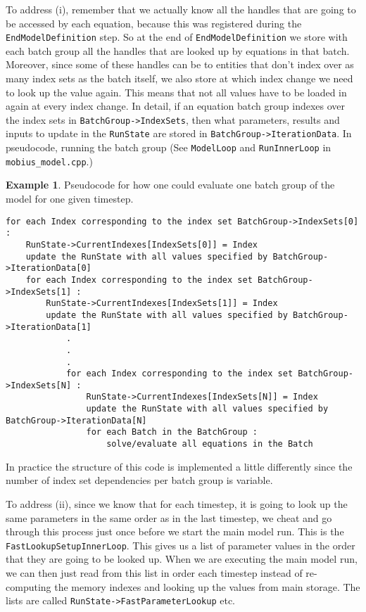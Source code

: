 \documentclass[11pt]{article}
\theoremstyle{definition}
\newtheorem{myexample}{Example}
\newenvironment{example}%
  {\begin{lrbox}{\examplebox}%
   \begin{minipage}{\dimexpr\linewidth-2\fboxsep}
   \begin{myexample}}%
  {\end{myexample}%
   \end{minipage}%
   \end{lrbox}%
   \begin{trivlist}
     \item[]\colorbox{silver}{\usebox\examplebox}
   \end{trivlist}}
\begin{document}
To address (i), remember that we actually know all the handles that are going to be accessed by each equation, because this was registered during the {\tt EndModelDefinition} step. So at the end of {\tt EndModelDefinition} we store with each batch group all the handles that are looked up by equations in that batch. Moreover, since some of these handles can be to entities that don't index over as many index sets as the batch itself, we also store at which index change we need to look up the value again. This means that not all values have to be loaded in again at every index change. In detail, if an equation batch group indexes over the index sets in {\tt BatchGroup->IndexSets}, then what parameters, results and inputs to update in the {\tt RunState} are stored in {\tt BatchGroup->IterationData}. In pseudocode, running the batch group (See {\tt ModelLoop} and {\tt RunInnerLoop} in {\tt mobius\_model.cpp}.)

\begin{example}
Pseudocode for how one could evaluate one batch group of the model for one given timestep.
\begin{lstlisting}[style = mycpp]
for each Index corresponding to the index set BatchGroup->IndexSets[0] :
	RunState->CurrentIndexes[IndexSets[0]] = Index
	update the RunState with all values specified by BatchGroup->IterationData[0]
	for each Index corresponding to the index set BatchGroup->IndexSets[1] :
		RunState->CurrentIndexes[IndexSets[1]] = Index
		update the RunState with all values specified by BatchGroup->IterationData[1]
			.
			.
			.
			for each Index corresponding to the index set BatchGroup->IndexSets[N] :
				RunState->CurrentIndexes[IndexSets[N]] = Index
				update the RunState with all values specified by BatchGroup->IterationData[N]
				for each Batch in the BatchGroup :
					solve/evaluate all equations in the Batch

\end{lstlisting}
In practice the structure of this code is implemented a little differently since the number of index set dependencies per batch group is variable.
\end{example}

To address (ii), since we know that for each timestep, it is going to look up the same parameters in the same order as in the last timestep, we cheat and go through this process just once before we start the main model run. This is the {\tt FastLookupSetupInnerLoop}. This gives us a list of parameter values in the order that they are going to be looked up. When we are executing the main model run, we can then just read from this list in order each timestep instead of re-computing the memory indexes and looking up the values from main storage. The lists are called {\tt RunState->FastParameterLookup} etc.
\end{document}
